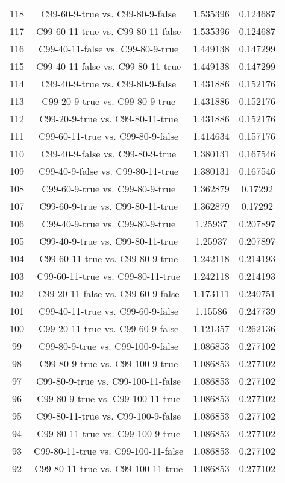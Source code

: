 \documentclass[a4paper,10pt]{article}
\begin{document}
\begin{landscape}
\begin{table}[!htp]
\begin{tabular}{cccc}
118&C99-60-9-true vs. C99-80-9-false&1.535396&0.124687\\
117&C99-60-11-true vs. C99-80-11-false&1.535396&0.124687\\
116&C99-40-11-false vs. C99-80-9-true&1.449138&0.147299\\
115&C99-40-11-false vs. C99-80-11-true&1.449138&0.147299\\
114&C99-40-9-true vs. C99-80-9-false&1.431886&0.152176\\
113&C99-20-9-true vs. C99-80-9-true&1.431886&0.152176\\
112&C99-20-9-true vs. C99-80-11-true&1.431886&0.152176\\
111&C99-60-11-true vs. C99-80-9-false&1.414634&0.157176\\
110&C99-40-9-false vs. C99-80-9-true&1.380131&0.167546\\
109&C99-40-9-false vs. C99-80-11-true&1.380131&0.167546\\
108&C99-60-9-true vs. C99-80-9-true&1.362879&0.17292\\
107&C99-60-9-true vs. C99-80-11-true&1.362879&0.17292\\
106&C99-40-9-true vs. C99-80-9-true&1.25937&0.207897\\
105&C99-40-9-true vs. C99-80-11-true&1.25937&0.207897\\
104&C99-60-11-true vs. C99-80-9-true&1.242118&0.214193\\
103&C99-60-11-true vs. C99-80-11-true&1.242118&0.214193\\
102&C99-20-11-false vs. C99-60-9-false&1.173111&0.240751\\
101&C99-40-11-true vs. C99-60-9-false&1.15586&0.247739\\
100&C99-20-11-true vs. C99-60-9-false&1.121357&0.262136\\
99&C99-80-9-true vs. C99-100-9-false&1.086853&0.277102\\
98&C99-80-9-true vs. C99-100-9-true&1.086853&0.277102\\
97&C99-80-9-true vs. C99-100-11-false&1.086853&0.277102\\
96&C99-80-9-true vs. C99-100-11-true&1.086853&0.277102\\
95&C99-80-11-true vs. C99-100-9-false&1.086853&0.277102\\
94&C99-80-11-true vs. C99-100-9-true&1.086853&0.277102\\
93&C99-80-11-true vs. C99-100-11-false&1.086853&0.277102\\
92&C99-80-11-true vs. C99-100-11-true&1.086853&0.277102\\

\end{tabular}
\end{table}
\end{landscape}
\end{document}

